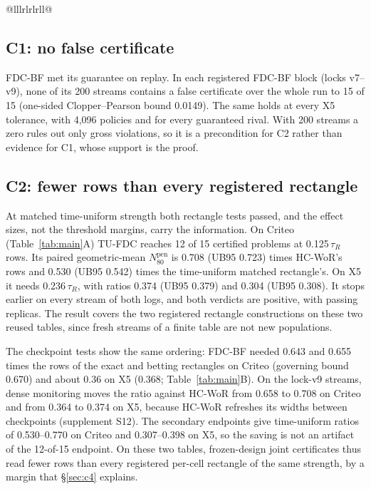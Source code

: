 \documentclass[sigconf,anonymous,review]{acmart}
\newcommand{\Npen}{N_{80}^{\text{pen}}}
\begin{document}
\begin{table}[t]
\begin{tabular}{@{}lllrlrlrll@{}}
\midrule
{} \\
\bottomrule
\end{tabular}
\end{table}

\subsection{C1: no false certificate}\label{sec:c1}

FDC-BF met its guarantee on replay. In each registered FDC-BF block (locks v7--v9), none of its 200 streams contains a false certificate over the whole run to 15 of 15 (one-sided Clopper--Pearson bound 0.0149). The same holds at every X5 tolerance, with 4,096 policies and for every guaranteed rival. With 200 streams a zero rules out only gross violations, so it is a precondition for C2 rather than evidence for C1, whose support is the proof.

\subsection{C2: fewer rows than every registered rectangle}\label{sec:c2}

At matched time-uniform strength both rectangle tests passed, and the effect sizes, not the threshold margins, carry the information. On Criteo (Table~\ref{tab:main}A) TU-FDC reaches 12 of 15 certified problems at 0.125\,$\tau_R$ rows. Its paired geometric-mean $\Npen$ is 0.708 (UB95 0.723) times HC-WoR's rows and 0.530 (UB95 0.542) times the time-uniform matched rectangle's. On X5 it needs 0.236\,$\tau_R$, with ratios 0.374 (UB95 0.379) and 0.304 (UB95 0.308). It stops earlier on every stream of both logs, and both verdicts are positive, with passing replicas. The result covers the two registered rectangle constructions on these two reused tables, since fresh streams of a finite table are not new populations.

The checkpoint tests show the same ordering: FDC-BF needed 0.643 and 0.655 times the rows of the exact and betting rectangles on Criteo (governing bound 0.670) and about 0.36 on X5 (0.368; Table~\ref{tab:main}B). On the lock-v9 streams, dense monitoring moves the ratio against HC-WoR from 0.658 to 0.708 on Criteo and from 0.364 to 0.374 on X5, because HC-WoR refreshes its widths between checkpoints (supplement S12). The secondary endpoints give time-uniform ratios of 0.530--0.770 on Criteo and 0.307--0.398 on X5, so the saving is not an artifact of the 12-of-15 endpoint. On these two tables, frozen-design joint certificates thus read fewer rows than every registered per-cell rectangle of the same strength, by a margin that \S\ref{sec:c4} explains.
\end{document}
